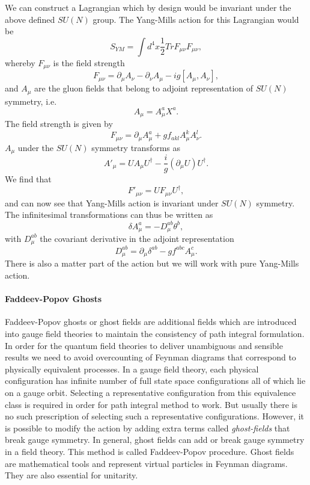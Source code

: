 We can construct a Lagrangian which by design would be invariant under
the above defined $SU(N)$ group. The Yang-Mills action for this
Lagrangian would be
$$S_{YM}=\int d^{4}x \frac{1}{2} Tr F_{\mu\nu}F_{\mu\nu},$$
whereby $F_{\mu\nu}$ is the field strength
$$ F_{\mu\nu}=\partial_{\mu}A_{\nu}-\partial_{\nu}A_{\mu}-ig[A_{\mu},A_{\nu}],$$
and $A_{\mu}$ are the gluon fields that belong to adjoint representation
of $SU(N)$ symmetry, i.e.
$$A_{\mu}=A^{a}_{\mu}X^{a}.$$
The field strength is given by
$$F_{\mu\nu}=\partial_{\mu}A^{a}_{\mu}+gf_{akl}A^{k}_{\mu}A^{l}_{\nu}.$$
$A_{\mu}$ under the $SU(N)$ symmetry transforms as
$$ A'_{\mu}=UA_{\mu}U^{\dagger}-\frac{i}{g}(\partial_{\mu}U)U^{\dagger}.$$
We find that
$$F'_{\mu\nu}=U F_{\mu\nu}U^{\dagger},$$
and can now see that Yang-Mills action is invariant under $SU(N)$ symmetry.
The infinitesimal transformations can thus be written as
$$\delta A^{a}_{\mu}=-D^{ab}_{\mu}\theta^{b},$$
with $D^{ab}_{\mu}$ the covariant derivative in the adjoint representation
$$ D^{ab}_{\mu}=\partial_{\mu}\delta^{ab}-g f^{abc}A^{c}_{\mu}.$$
There is also a matter part of the action but we will work with pure Yang-Mills action.

\paragraph{Faddeev-Popov Ghosts}
Faddeev-Popov ghosts or ghost fields are additional fields which are
introduced into gauge field theories to maintain the consistency of path
integral formulation. In order for the quantum field theories to deliver
unambiguous and sensible results we need to avoid overcounting of Feynman
diagrams that correspond to physically equivalent processes. In a gauge
field theory, each physical configuration has infinite number of full
state space configurations all of which lie on a gauge orbit. Selecting a
representative configuration from this equivalence class is required in
order for path integral method to work. But usually there is no such
prescription of selecting such a representative configurations. However,
it is possible to modify the action by adding extra terms called
\emph{ghost-fields} that break gauge symmetry. In general, ghost fields
can add or break gauge symmetry in a field theory. This method is called
Faddeev-Popov procedure. Ghost fields are mathematical tools and
represent virtual particles in Feynman diagrams. They are also essential
for unitarity.

